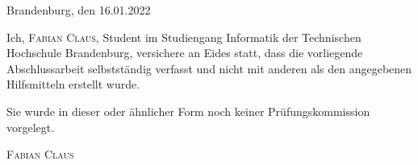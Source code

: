 \thispagestyle{empty}

\large
\begin{flushright}
  Brandenburg, den 16.01.2022
\end{flushright}

\vspace*{50mm}
Ich, {\scshape Fabian Claus}, Student im Studiengang Informatik der
Technischen Hochschule Brandenburg, versichere an Eides statt, dass die vorliegende
Abschlussarbeit selbstständig verfasst und nicht mit anderen als den
angegebenen Hilfsmitteln erstellt wurde.

Sie wurde in dieser oder ähnlicher Form noch keiner Prüfungskommission
vorgelegt.\\

\vspace*{50mm}

\begin{flushright}
  {\scshape Fabian Claus}
\end{flushright}

\normalsize